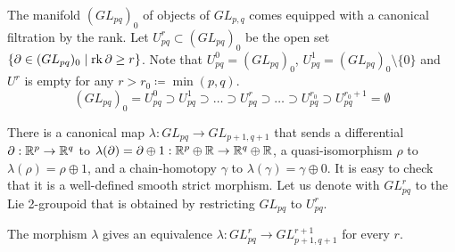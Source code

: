 
The manifold $(GL_{pq})_0$ of objects of $GL_{p,q}$ comes equipped with a canonical filtration by the rank.
Let $U^r_{pq} \subset (GL_{pq})_0$ be the open set $\{\partial\in (GL_{pq})_0 \mid \operatorname{rk}\partial\geq r\}$.
Note that $U^0_{pq}=(GL_{pq})_0$, $U^1_{pq}=(GL_{pq})_0\setminus\{0\}$ and $U^r$ is empty for any $r > r_0 \coloneqq \min(p,q)$.
$$ (GL_{pq})_0 = U^0_{pq} \supset U^1_{pq} \supset \dots \supset U^r_{pq} \supset \dots \supset U^{r_0}_{pq} \supset U^{r_0+1}_{pq} = \emptyset $$

There is a canonical map $\lambda:GL_{pq} \to GL_{p+1,q+1}$ that sends a differential $\partial:\mathbb R^p\to\mathbb R^q$ to $\lambda(\partial)=\partial\oplus 1:\mathbb R^p\oplus\mathbb R\to\mathbb R^q\oplus\mathbb R$, a quasi-isomorphism $\rho$ to $\lambda(\rho)=\rho\oplus 1$, and a chain-homotopy $\gamma$ to $\lambda(\gamma)=\gamma\oplus 0$. It is easy to check that it is a well-defined smooth strict morphism.
Let us denote with $GL^r_{pq}$ to the Lie 2-groupoid that is obtained by restricting $GL_{pq}$ to $U^r_{pq}$.

\begin{lemma}
The morphism $\lambda$ gives an equivalence $\lambda:GL^r_{pq}\to GL^{r+1}_{p+1,q+1}$ for every $r$.%
\end{lemma}

